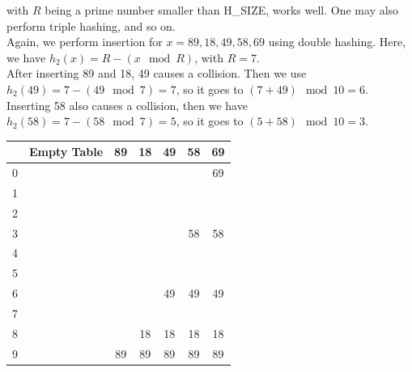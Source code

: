 \begin{minipage}{0.5\textwidth}
with \(R\) being a prime number smaller than H\_SIZE, works well. One may also perform triple hashing, and so on. \\[5pt]
Again, we perform insertion for \(x = 89, 18, 49, 58, 69\) using double hashing. Here, we have \(h_2(x) = R - (x \mod R)\), with \(R = 7\). \\[5pt]
After inserting 89 and 18, 49 causes a collision. Then we use \(h_2(49) = 7 - (49 \mod 7) = 7\), so it goes to \((7 + 49) \mod 10 = 6\). Inserting 58 also causes a collision, then we have \(h_2(58) = 7 - (58 \mod 7) = 5\), so it goes to \((5 + 58) \mod 10 = 3\). 
\end{minipage}
\begin{minipage}{0.5\textwidth}
\begin{table}[H]
  \centering
  \begin{tabular}{c|c|c|c|c|c|c}
      \toprule
        & Empty Table & 89 & 18 & 49 & 58 & 69  \\
    \midrule
      0 &  &  &  &  &  & 69  \\
      1 &  &  &  &  &  &   \\
      2 &  &  &  &  &  &   \\
      3 &  &  &  &  & 58 & 58  \\
      4 &  &  &  &  &  &   \\
      5 &  &  &  &  &  &   \\
      6 &  &  &  & 49 & 49 & 49  \\
      7 &  &  &  &  &  &   \\
      8 &  &  & 18 & 18 & 18 & 18  \\
      9 &  & 89 & 89 & 89 & 89 & 89  \\
      \bottomrule
  \end{tabular}
\end{table}
\end{minipage}

